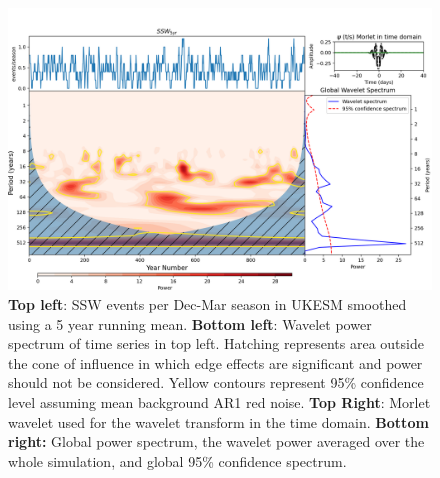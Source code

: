 \documentclass[wcd, manuscript]{copernicus}
\begin{document}
\begin{center}
\begin{figure}[h!]
\noindent\includegraphics[width = 0.8\linewidth]{new_changed_figures/SSW_wavelet_5_yr_fig3_new_levels.png}
\caption{\textbf{Top left}: SSW events per Dec-Mar season in UKESM smoothed using a 5 year running mean. \textbf{Bottom left}: Wavelet power spectrum of time series in top left. Hatching represents area outside the cone of influence in which edge effects are significant and power should not be considered. Yellow contours represent 95\% confidence level assuming mean background AR1 red noise. \textbf{Top Right}: Morlet wavelet used for the wavelet transform in the time domain. \textbf{Bottom right:} Global power spectrum, the wavelet power averaged over the whole simulation, and global 95\% confidence spectrum.}
\label{fig3}
\end{figure}
\end{center}
\end{document}
